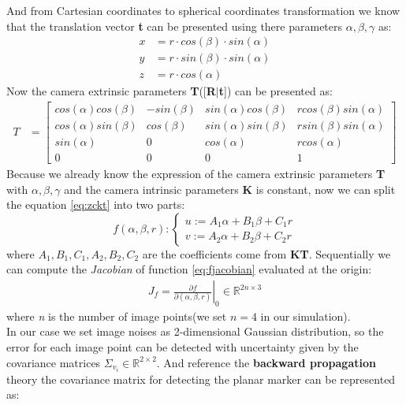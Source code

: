 And from Cartesian coordinates to spherical coordinates transformation we know that the translation vector \textbf{t} can be presented using there parameters $\alpha,\beta,\gamma$ as:
\begin{align*}
x &= r \cdot cos(\beta) \cdot sin(\alpha) \\
y &= r \cdot sin(\beta) \cdot sin(\alpha)\\
z &= r \cdot cos(\alpha)
\end{align*}
Now the camera extrinsic parameters \textbf{T}([\textbf{R}$|$\textbf{t}]) can be presented as:
\begin{align*}
T &=\begin{bmatrix} 
                cos(\alpha)cos(\beta) & -sin(\beta) & sin(\alpha)cos(\beta) & r cos(\beta) sin(\alpha)\\
                cos(\alpha)sin(\beta) & cos(\beta) & sin(\alpha)sin(\beta)  & r sin(\beta) sin(\alpha)\\
                sin(\alpha) & 0 & cos(\alpha) & r cos(\alpha) \\
                0 & 0 & 0 & 1                
                \end{bmatrix} 
\end{align*}
Because we already know the expression of the camera extrinsic parameters \textbf{T} with $\alpha,\beta,\gamma$ and the camera intrinsic parameters \textbf{K} is constant, now we can split the equation \ref{eq:zckt} into two parts:
\begin{equation}\label{eq:fjacobian}
 f(\alpha,\beta,r) : 
  \begin{cases} 
     u := A_1 \alpha + B_1 \beta + C_1 r \\
     v := A_2 \alpha + B_2 \beta + C_2 r 
  \end{cases}
\end{equation}
where $\mathit{A_1,B_1,C_1,A_2,B_2,C_2}$ are the coefficients come from \textbf{KT}. Sequentially we can compute the \textit{Jacobian} of function \ref{eq:fjacobian} evaluated at the origin:
\begin{align}\label{eq:evaluated}
J_f =  
\left.\frac{\partial f}{\partial(\alpha,\beta,r)}\right|_0 \in \mathbb{R}^{2n \times 3}
\end{align} 
where \textit{n} is the number of image points(we set $n = 4$ in our simulation).\\
In our case we set image noises as 2-dimensional Gaussian distribution, so the error for each image point can be detected with uncertainty given by the covariance matrices $\Sigma_{v_i} \in \mathbb{R}^{2 \times 2}$. And reference the \textbf{backward propagation} theory the covariance matrix for detecting the planar marker can be represented as:                
